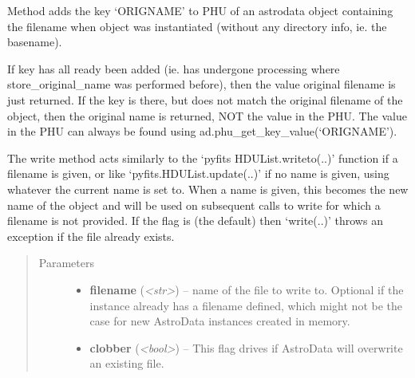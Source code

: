 \documentclass[letterpaper,10pt,english]{sphinxmanual}
\begin{document}
\begin{fulllineitems}
\begin{fulllineitems}
\end{fulllineitems}


\begin{fulllineitems}
\label{astro_class:astrodata.AstroData.AstroData.store_original_name}
Method adds the key `ORIGNAME' to PHU of an astrodata object 
containing the filename when object was instantiated (without any 
directory info, ie. the basename).

If key has all ready been added (ie. has undergone processing where
store\_original\_name was performed before), then the value original 
filename is just returned.  If the key is there, but does not match
the original filename of the object, then the original name is 
returned, NOT the value in the PHU. The value in the PHU can always be
found using ad.phu\_get\_key\_value(`ORIGNAME').

\end{fulllineitems}


\begin{fulllineitems}
\label{astro_class:astrodata.AstroData.AstroData.write}
The write method acts similarly to the `pyfits HDUList.writeto(..)'
function if a filename is given, or like `pyfits.HDUList.update(..)' if 
no name is given, using whatever the current name is set to. When a name
is given, this becomes the new name of the  object and
will be used on subsequent calls to  write for which a filename is not
provided. If the  flag is  (the default) then 
`write(..)' throws an exception if the file already exists.
\begin{quote}\begin{description}
\item[{Parameters}] \leavevmode\begin{itemize}
\item {} 
\textbf{filename} (\emph{\textless{}str\textgreater{}}) -- name of the file to write to. Optional if the instance
already has a filename defined, which might not be the 
case for new AstroData instances created in memory.

\item {} 
\textbf{clobber} (\emph{\textless{}bool\textgreater{}}) -- This flag drives if AstroData will overwrite an existing
file.


\end{itemize}
\end{description}
\end{quote}
\end{fulllineitems}
\end{fulllineitems}
\end{document}
